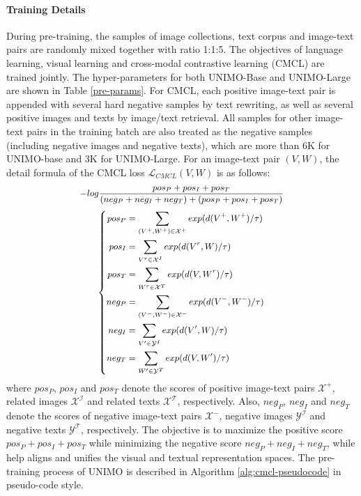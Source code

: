 \documentclass[11pt,a4paper]{article}
\begin{document}
\paragraph{Training Details} During pre-training, the samples of image collections, text corpus and image-text pairs are randomly mixed together with ratio 1:1:5. The objectives of language learning, visual learning and cross-modal contrastive learning (CMCL) are trained jointly.
The hyper-parameters for both UNIMO-Base and UNIMO-Large are shown in Table \ref{pre-params}.
For CMCL, each positive image-text pair is appended with several hard negative samples by text rewriting, as well as several positive images and texts by image/text retrieval.
All samples for other image-text pairs in the training batch are also treated as the negative samples (including negative images and negative texts), which are more than 6K for UNIMO-base and 3K for UNIMO-Large.
For an image-text pair $(V,W)$, the detail formula of the CMCL loss $\mathcal{L}_{CMCL}(V,W)$ is as follows:
\begin{equation}
\small
\begin{aligned}
      -log \frac{pos_P + pos_I + pos_T} {(neg_P + neg_I + neg_T) + (pos_P + pos_I + pos_T)}
\end{aligned}
\label{eq4}
\end{equation}
\begin{equation}
\small
\begin{aligned}
      \left\{
      \begin{aligned}
      pos_P & = \sum_{(V^{+},W^{+}) \in \mathcal{X}^{+}} exp(d(V^{+},W^{+})/ \tau) \\
      pos_I & = \sum_{V^{r} \in \mathcal{X}^{I}} exp(d(V^{r},W)/ \tau) \\
      pos_T & = \sum_{W^{r} \in \mathcal{X}^{T}} exp(d(V,W^{r})/ \tau) \\
      neg_P & = \sum_{(V^{-}, W^{-}) \in \mathcal{X}^{-}} exp(d(V^{-}, W^{-})/ \tau) \\
      neg_I & = \sum_{V' \in \mathcal{Y}^{I}} exp(d(V', W)/ \tau) \\
      neg_T & = \sum_{W' \in \mathcal{Y}^{T}} exp(d(V, W')/ \tau) \\
      \end{aligned}
      \right.
\end{aligned}
\label{eq41}
\end{equation}
where $pos_P$, $pos_I$ and $pos_T$ denote the scores of positive image-text pairs $\mathcal{X^+}$, related images $\mathcal{X^I}$ and related texts $\mathcal{X^T}$, respectively.
Also, $neg_P$, $neg_I$ and $neg_T$ denote the scores of negative image-text pairs $\mathcal{X^-}$, negative images $\mathcal{Y^I}$ and negative texts $\mathcal{Y^T}$, respectively.
The objective is to maximize the positive score $pos_P + pos_I + pos_T$ while minimizing the negative score $neg_P + neg_I + neg_T$, while help aligns and unifies the visual and textual representation spaces. The pre-training process of UNIMO is described in Algorithm \ref{alg:cmcl-pseudocode} in pseudo-code style.
\end{document}
